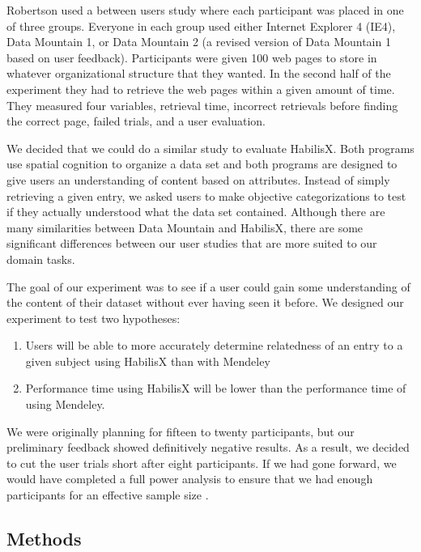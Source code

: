\documentclass{article}
\begin{document}
Robertson used a between users study where each participant was placed in one of three groups.  Everyone in each group used either Internet Explorer 4 (IE4), Data Mountain 1, or Data Mountain 2 (a revised version of Data Mountain 1 based on user feedback).  Participants were given 100 web pages to store in whatever organizational structure that they wanted.  In the second half of the experiment they had to retrieve the web pages within a given amount of time.  They measured four variables, retrieval time, incorrect retrievals before finding the correct page, failed trials, and a user evaluation.  

We decided that we could do a similar study to evaluate HabilisX.  Both programs use spatial cognition to organize a data set and both programs are designed to give users an understanding of content based on attributes.  Instead of simply retrieving a given entry, we asked users to make objective categorizations to test if they actually understood what the data set contained.  Although there are many similarities between Data Mountain and HabilisX, there are some significant differences between our user studies that are more suited to our domain tasks.   

The goal of our experiment was to see if a user could gain some understanding of the content of their dataset without ever having seen it before.  We designed our experiment to test two hypotheses:  

\begin{enumerate}
\item{Users will be able to more accurately determine relatedness of an entry to a given subject using HabilisX than with Mendeley}
\item{Performance time using HabilisX will be lower than the performance time of using Mendeley.}
\end{enumerate}

	We were originally planning for fifteen to twenty participants, but our preliminary feedback showed definitively negative results.  As a result, we decided to cut the user trials short after eight participants.  If we had gone forward, we would have completed a full power analysis to ensure that we had enough participants for an effective sample size \cite{Lenth2001}.  
	





\subsection{Methods}
\end{document}
